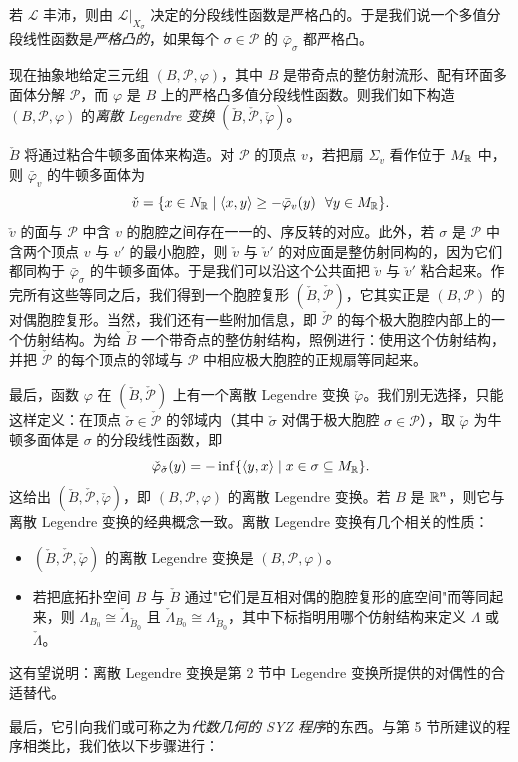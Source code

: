 若 $\mathcal L$ 丰沛，则由 $\mathcal L|_{X_\sigma}$ 决定的分段线性函数是严格凸的。于是我们说一个多值分段线性函数是\emph{严格凸的}，如果每个 $\sigma\in\mathcal P$ 的 $\bar\varphi_\sigma$ 都严格凸。

现在抽象地给定三元组 $(B,\mathcal P,\varphi)$，其中 $B$ 是带奇点的整仿射流形、配有环面多面体分解 $\mathcal P$，而 $\varphi$ 是 $B$ 上的严格凸多值分段线性函数。则我们如下构造 $(B,\mathcal P,\varphi)$ 的\emph{离散 Legendre 变换} $(\check B,\check{\mathcal P},\check\varphi)$。

$\check B$ 将通过粘合牛顿多面体来构造。对 $\mathcal P$ 的顶点 $v$，若把扇 $\Sigma_v$ 看作位于 $M_{\mathbb{R}}$ 中，则 $\bar\varphi_v$ 的牛顿多面体为
\[
\check v=\{x\in N_{\mathbb{R}}\mid\langle x,y\rangle\ge-\bar\varphi_v(y)\ \ \forall y\in M_{\mathbb{R}}\}.
\]
$\check v$ 的面与 $\mathcal P$ 中含 $v$ 的胞腔之间存在一一的、序反转的对应。此外，若 $\sigma$ 是 $\mathcal P$ 中含两个顶点 $v$ 与 $v'$ 的最小胞腔，则 $\check v$ 与 $\check v'$ 的对应面是整仿射同构的，因为它们都同构于 $\bar\varphi_\sigma$ 的牛顿多面体。于是我们可以沿这个公共面把 $\check v$ 与 $\check v'$ 粘合起来。作完所有这些等同之后，我们得到一个胞腔复形 $(\check B,\check{\mathcal P})$，它其实正是 $(B,\mathcal P)$ 的对偶胞腔复形。当然，我们还有一些附加信息，即 $\check{\mathcal P}$ 的每个极大胞腔内部上的一个仿射结构。为给 $\check B$ 一个带奇点的整仿射结构，照例进行：使用这个仿射结构，并把 $\check{\mathcal P}$ 的每个顶点的邻域与 $\mathcal P$ 中相应极大胞腔的正规扇等同起来。

最后，函数 $\varphi$ 在 $(\check B,\check{\mathcal P})$ 上有一个离散 Legendre 变换 $\check\varphi$。我们别无选择，只能这样定义：在顶点 $\check\sigma\in\check{\mathcal P}$ 的邻域内（其中 $\check\sigma$ 对偶于极大胞腔 $\sigma\in\mathcal P$），取 $\check\varphi$ 为牛顿多面体是 $\sigma$ 的分段线性函数，即
\[
\check\varphi_{\check\sigma}(y)=-\inf\{\langle y,x\rangle\mid x\in\sigma\subseteq M_{\mathbb{R}}\}.
\]
这给出 $(\check B,\check{\mathcal P},\check\varphi)$，即 $(B,\mathcal P,\varphi)$ 的离散 Legendre 变换。若 $B$ 是 $\mathbb{R}^n$，则它与离散 Legendre 变换的经典概念一致。离散 Legendre 变换有几个相关的性质：
\begin{itemize}
\item $(\check B,\check{\mathcal P},\check\varphi)$ 的离散 Legendre 变换是 $(B,\mathcal P,\varphi)$。
\item 若把底拓扑空间 $B$ 与 $\check B$ 通过"它们是互相对偶的胞腔复形的底空间"而等同起来，则 $\Lambda_{B_0}\cong\check\Lambda_{\check B_0}$ 且 $\check\Lambda_{B_0}\cong\Lambda_{\check B_0}$，其中下标指明用哪个仿射结构来定义 $\Lambda$ 或 $\check\Lambda$。
\end{itemize}

这有望说明：离散 Legendre 变换是第 2 节中 Legendre 变换所提供的对偶性的合适替代。

最后，它引向我们或可称之为\emph{代数几何的 SYZ 程序}的东西。与第 5 节所建议的程序相类比，我们依以下步骤进行：

